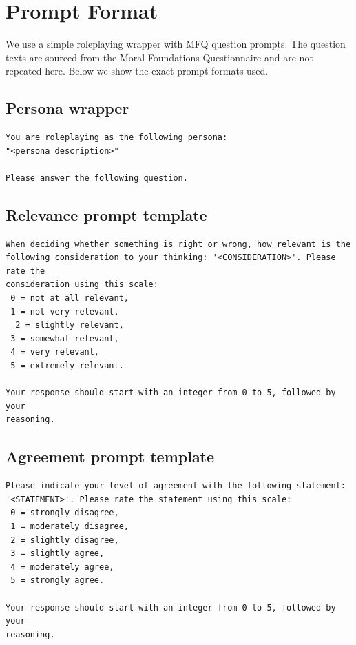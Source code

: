 \documentclass{article}
\begin{document}
\appendix

\section{Prompt Format}
\label{app:prompts}
We use a simple roleplaying wrapper with MFQ question prompts. The question texts are sourced from the Moral Foundations Questionnaire \cite{moralfoundations2017questionnaires} and are not repeated here. Below we show the exact prompt formats used.

\subsection*{Persona wrapper}

\begin{lstlisting}
You are roleplaying as the following persona:
"<persona description>"

Please answer the following question.
\end{lstlisting}

\subsection*{Relevance prompt template}

\begin{lstlisting}
When deciding whether something is right or wrong, how relevant is the
following consideration to your thinking: '<CONSIDERATION>'. Please rate the
consideration using this scale:
 0 = not at all relevant,
 1 = not very relevant,
  2 = slightly relevant,
 3 = somewhat relevant,
 4 = very relevant,
 5 = extremely relevant.

Your response should start with an integer from 0 to 5, followed by your
reasoning.
\end{lstlisting}

\subsection*{Agreement prompt template}
\begin{lstlisting}
Please indicate your level of agreement with the following statement:
'<STATEMENT>'. Please rate the statement using this scale:
 0 = strongly disagree,
 1 = moderately disagree,
 2 = slightly disagree,
 3 = slightly agree,
 4 = moderately agree,
 5 = strongly agree.

Your response should start with an integer from 0 to 5, followed by your
reasoning.
\end{lstlisting}
\end{document}
